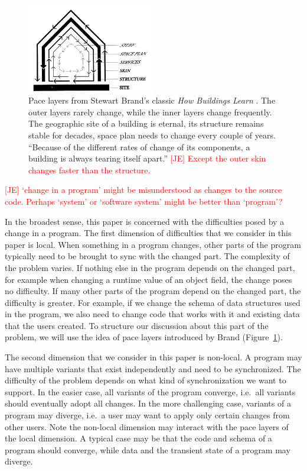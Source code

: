 \documentclass[english,submission]{programming}
\begin{document}
\begin{figure}[t]
\vspace{-1em}
\centering
\includegraphics[width=0.5\textwidth]{figures/layers.png}
\caption{Pace layers from Stewart Brand's classic \emph{How Buildings Learn} \cite{Brand95}.
  The outer layers rarely change, while the inner layers change frequently. The geographic
  site of a building is eternal, its structure remains stable for decades, space plan
  needs to change every couple of years. ``Because of the different rates of change of its
  components, a building is always tearing itself apart.''
  \textcolor{red}{[JE] Except the outer skin changes faster than the structure.}
  }
\label{fig:layers}
\end{figure}

\textcolor{red}{[JE] `change in a program' might be misunderstood as changes to the source code. Perhaps `system' or `software system' might be better than `program'? }

In the broadest sense, this paper is concerned with the difficulties posed by a change
in a program. The first dimension of difficulties that we consider in this paper is
local. When something in a program changes, other parts of the program typically
need to be brought to sync with the changed part. The complexity of the problem varies.
If nothing else in the program depends on the changed part, for example when changing
a runtime value of an object field, the change poses no difficulty.
If many other parts of the program depend on the changed part, the difficulty is greater.
For example, if we change the schema of data structures used in the program, we also need to
change code that works with it and existing data that the users created. To structure our
discussion about this part of the problem, we will use the idea of pace layers introduced by
Brand \cite{Brand95,Brand18} (Figure~\ref{fig:layers}).

The second dimension that we consider in this paper is non-local. A program may have multiple
variants that exist independently and need to be synchronized. The difficulty of the problem
depends on what kind of synchronization we want to support. In the easier case, all variants
of the program converge, i.e.~all variants should eventually adopt all changes. In the more
challenging case, variants of a program may diverge, i.e.~a user may want to apply only certain
changes from other users. Note the non-local dimension may interact with the pace layers of the
local dimension. A typical case may be that the code and schema of a program should converge,
while data and the transient state of a program may diverge.
\end{document}
